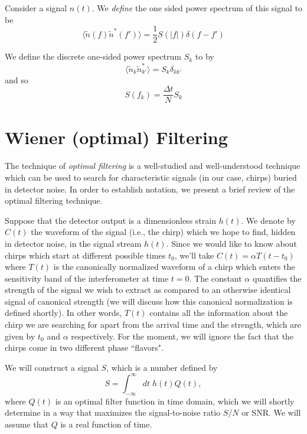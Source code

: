 Consider a signal $n(t)$. We \emph{define} the one sided power spectrum of
this signal to be
\begin{equation}
\langle \tilde{n}(f) \tilde{n}^\ast(f') \rangle
= \frac{1}{2} S(|f|) \delta(f-f')
\end{equation}

We define the discrete one-sided power spectrum $S_k$ to by
\begin{equation}
\langle \tilde{n}_k \tilde{n}^\ast_{k'} \rangle = S_k \delta_{kk'}
\end{equation}
and so
\begin{equation}
S(f_k) = \frac{\Delta t}{N} S_k
\end{equation}

\section{Wiener (optimal) Filtering}

The technique of {\it optimal filtering} is a well-studied and
well-understood technique which can be used to search for
characteristic signals (in our case, chirps) buried in detector noise.
In order to establish notation, we present a brief review of the optimal 
filtering technique.

Suppose that the detector output is a dimensionless strain $h(t)$.
We denote by ${C}(t)$ the waveform of the signal (i.e.,
the chirp) which we hope to find, hidden in detector noise, in the
signal stream $h(t)$.  Since we would like to know about chirps which
start at different possible times $t_0$, we'll take ${C}(t) =
\alpha T(t-t_0)$ where $T(t)$ is the canonically normalized waveform 
of a chirp which enters the sensitivity band of the interferometer at 
time $t=0$. The constant $\alpha$ quantifies the strength of the signal
we wish to extract as compared to an otherwise identical signal of 
canonical strength (we will discuss how this canonical normalization
is defined shortly). In other words, $T(t)$ contains all the 
information about the chirp we are searching for apart from the 
arrival time and the strength, which are given by $t_0$ and $\alpha$ 
respectively. For the moment, we will ignore the fact that 
the chirps come in two different phase ``flavors".

We will construct a signal $S$, which is a number defined by
\begin{equation}
S = \int_{-\infty}^\infty dt \;h(t) Q(t),
\end{equation}
where $Q(t)$ is an optimal filter function in time domain, which we
will shortly determine in a way that maximizes the signal-to-noise
ratio $S/N$ or SNR.  We will assume that $Q$ is a real function of
time.

